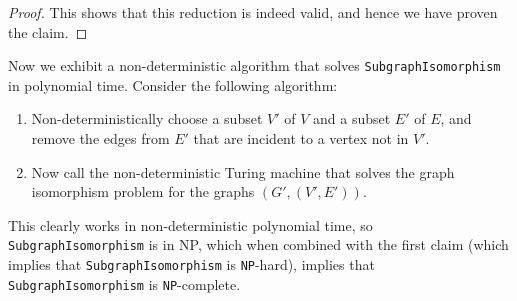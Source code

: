 \begin{soln}
\begin{proof}
        This shows that this reduction is indeed valid, and hence we have proven the claim.
    \end{proof}
    Now we exhibit a non-deterministic algorithm that solves \texttt{SubgraphIsomorphism} in polynomial time. Consider the following algorithm:
    \begin{enumerate}
        \item Non-deterministically choose a subset $V'$ of $V$ and a subset $E'$ of $E$, and remove the edges from $E'$ that are incident to a vertex not in $V'$.
        \item Now call the non-deterministic Turing machine that solves the graph isomorphism problem for the graphs $(G', (V', E'))$.
    \end{enumerate}
    This clearly works in non-deterministic polynomial time, so \texttt{SubgraphIsomorphism} is in NP, which when combined with the first claim (which implies that
    \texttt{SubgraphIsomorphism} is \texttt{NP}-hard), implies that \texttt{SubgraphIsomorphism} is \texttt{NP}-complete.
\end{soln}
